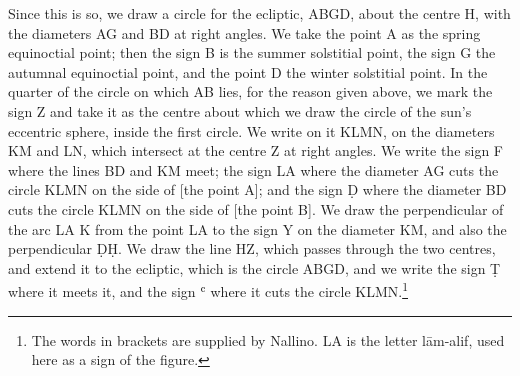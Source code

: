 \documentclass[11pt]{article}
\begin{document}
\par Since this is so, we draw a circle for the ecliptic, ABGD, about the centre H, with the diameters AG and BD at right angles. We take the point A as the spring equinoctial point; then the sign B is the summer solstitial point, the sign G the autumnal equinoctial point, and the point D the winter solstitial point. In the quarter of the circle on which AB lies, for the reason given above, we mark the sign Z and take it as the centre about which we draw the circle of the sun's eccentric sphere, inside the first circle. We write on it KLMN, on the diameters KM and LN, which intersect at the centre Z at right angles. We write the sign F where the lines BD and KM meet; the sign LA where the diameter AG cuts the circle KLMN on the side of [the point A]; and the sign Ḍ where the diameter BD cuts the circle KLMN on the side of [the point B]. We draw the perpendicular of the arc LA K from the point LA to the sign Y on the diameter KM, and also the perpendicular ḌḤ. We draw the line HZ, which passes through the two centres, and extend it to the ecliptic, which is the circle ABGD, and we write the sign Ṭ where it meets it, and the sign ʿ where it cuts the circle KLMN.\footnote{The words in brackets are supplied by Nallino. LA is the letter lām-alif, used here as a sign of the figure.}\par
\end{document}
